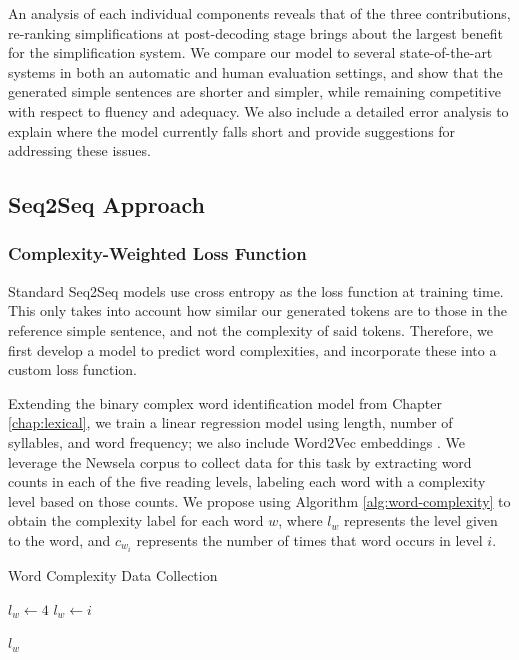 \documentclass[thesis.tex]{subfiles}
\begin{document}
An analysis of each individual components reveals that of the three contributions, re-ranking simplifications at post-decoding stage brings about the largest benefit for the simplification system. We compare our model to several state-of-the-art systems in both an automatic and human evaluation settings, and show that the generated simple sentences are shorter and simpler, while remaining competitive with respect to fluency and adequacy. We also include a detailed error analysis to explain where the model currently falls short and provide suggestions for addressing these issues.

\subsection{Seq2Seq Approach}

\subsubsection{Complexity-Weighted Loss Function} \label{loss}

Standard Seq2Seq models use cross entropy as the loss function at training time. This only takes into account how similar our generated tokens are to those in the reference simple sentence, and not the complexity of said tokens. Therefore, we first develop a model to predict word complexities, and incorporate these into a custom loss function.

Extending the binary complex word identification model from Chapter \ref{chap:lexical}, we train a linear regression model using length, number of syllables, and word frequency; we also include Word2Vec embeddings \citep{mikolov2013distributed}. We leverage the Newsela corpus to collect data for this task by extracting word counts in each of the five reading levels, labeling each word with a complexity level based on those counts. We propose using Algorithm \ref{alg:word-complexity} to obtain the complexity label for each word $w$, where $l_w$ represents the level given to the word, and $c_{w_i}$ represents the number of times that word occurs in level $i$.

\begin{algorithm}
\caption{Word Complexity Data Collection}
\label{alg:word-complexity}

\begin{algorithmic}[1]
\State $l_w \gets 4$ 
            \State $l_w \gets i$
        \EndIf
    \EndIf
\EndFor

\Return $l_w$
\EndProcedure
\end{algorithmic}
\end{algorithm}
\end{document}
